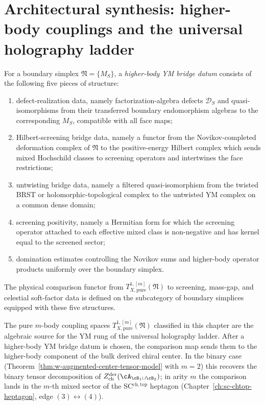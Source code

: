 \section{Architectural synthesis: higher-body couplings and the universal holography ladder}
\label{sec:ym-higher-body-holography-synthesis}

\begin{definition}
\label{def:higher-body-ym-bridge-datum}
For a boundary simplex $\mathfrak N=\{M_S\}$, a \emph{higher-body YM
bridge datum} consists of the following five pieces of structure:
\begin{enumerate}[label=(\roman*)]
\item defect-realization data, namely factorization-algebra defects
$\mathcal D_S$ and quasi-isomorphisms from their transferred boundary
endomorphism algebras to the corresponding $M_S$, compatible with all
face maps;
\item Hilbert-screening bridge data, namely a functor from the
Novikov-completed deformation complex of $\mathfrak N$ to the
positive-energy Hilbert complex which sends mixed Hochschild classes to
screening operators and intertwines the face restrictions;
\item untwisting bridge data, namely a filtered quasi-isomorphism from
the twisted BRST or holomorphic-topological complex to the untwisted YM
complex on a common dense domain;
\item screening positivity, namely a Hermitian form for which the
screening operator attached to each effective mixed class is
non-negative and has kernel equal to the screened sector;
\item domination estimates controlling the Novikov sums and higher-body
operator products uniformly over the boundary simplex.
\end{enumerate}
The physical comparison functor from
$T^{1,[m]}_{X,\mathrm{pure}}(\mathfrak N)$ to screening, mass-gap, and
celestial soft-factor data is defined on the subcategory of boundary
simplices equipped with these five structures.
\end{definition}

The pure $m$-body coupling spaces $T^{1,[m]}_{X,\mathrm{pure}}(\mathfrak N)$ classified
in this chapter are the algebraic source for the YM rung of the
universal holography ladder. After a higher-body YM bridge datum is
chosen, the comparison map sends them to the higher-body component of
the bulk derived chiral center. In the binary case
(Theorem~\ref{thm:w-augmented-center-tensor-model} with $m=2$) this
recovers the binary tensor decomposition of
$Z^{\mathrm{der}}_{\mathrm{ch}}(\cA_{\cB_1\sqcup\cB_2})$; in arity
$m$ the comparison lands in the $m$-th mixed sector of the
SC$^{\mathrm{ch,top}}$ heptagon (Chapter~\ref{ch:sc-chtop-heptagon},
edge $(3)\leftrightarrow(4)$).

